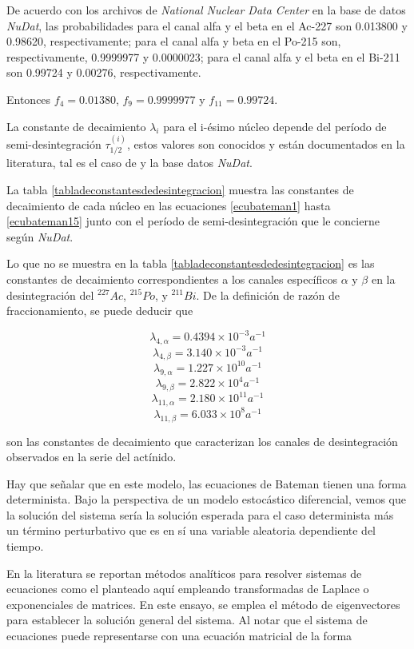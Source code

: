 De acuerdo con los archivos de \textit{National Nuclear Data Center} en la base de datos \textit{NuDat}, las probabilidades para el canal alfa y el beta en el Ac-227 son 0.013800 y 0.98620, respectivamente; para el canal alfa y beta en el Po-215 son, respectivamente, 0.9999977 y 0.0000023; para el canal alfa y el beta en el Bi-211 son 0.99724 y 0.00276, respectivamente.

Entonces $f_4=0.01380$, $f_9=0.9999977$ y $f_{11}=0.99724$.

La constante de decaimiento $\lambda_i$ para el i-ésimo núcleo depende del período de semi-desintegración $\tau_{1/2}^{(i)}$, estos valores son conocidos y están documentados en la literatura, tal es el caso de \cite{Flanagan1954} y la base datos \textit{NuDat}. 

La tabla \ref{tabladeconstantesdedesintegracion} muestra las constantes de decaimiento de cada núcleo en las ecuaciones \ref{ecubateman1} hasta \ref{ecubateman15} junto con el período de semi-desintegración que le concierne según \textit{NuDat}.

Lo que no se muestra en la tabla \ref{tabladeconstantesdedesintegracion} es las constantes de decaimiento correspondientes a los canales específicos $\alpha$ y $\beta$ en la desintegración del $^227 Ac$, $^215 Po$, y $^211 Bi$. De la definición de razón de fraccionamiento, se puede deducir que

$$\lambda_{4,\alpha}=0.4394\times 10^{-3}\unit{a^{-1}}$$
$$\lambda_{4,\beta}=3.140\times 10^{-3}\unit{a^{-1}}$$
$$\lambda_{9,\alpha}=1.227\times 10^{10}\unit{a^{-1}}$$
$$\lambda_{9,\beta}=2.822\times 10^{4}\unit{a^{-1}}$$
$$\lambda_{11,\alpha}=2.180\times 10^{11}\unit{a^{-1}}$$
$$\lambda_{11,\beta}=6.033\times 10^{8}\unit{a^{-1}}$$

\noindent son las constantes de decaimiento que caracterizan los canales de desintegración observados en la serie del actínido. 

Hay que señalar que en este modelo, las ecuaciones de Bateman tienen una forma determinista. Bajo la perspectiva de un modelo estocástico diferencial, vemos que la solución del sistema sería la solución esperada para el caso determinista más un término perturbativo que es en sí una variable aleatoria dependiente del tiempo. 

En la literatura se reportan métodos analíticos para resolver sistemas de ecuaciones como el planteado aquí empleando transformadas de Laplace o exponenciales de matrices. En este ensayo, se emplea el método de eigenvectores para establecer la solución general del sistema. Al notar que el sistema de ecuaciones puede representarse con una ecuación matricial de la forma

